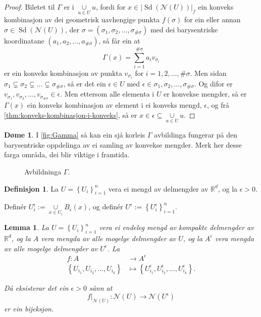 \documentclass[a4paper, 12pt, norsk]{article}
\theoremstyle{plain}
\newtheorem{lemma}[theorem]{Lemma}
\theoremstyle{definition}
\newtheorem{definition}[theorem]{Definisjon}
\newtheorem{example}[theorem]{Døme}
\newcommand{\Rb}{\mathbb{R}}
\newcommand{\Nc}{\mathcal{N}}
\newcommand{\union}{ \mathop{\cup}\limits }
\newcommand{\gr}[1]{ \lvert #1 \rvert } %
\newcommand{\set}[1]{ \left\{ #1 \right\} } %
\newcommand{\tuple}[1]{ \left( #1 \right) } %
\DeclareMathOperator{\Sd}{Sd} %
\begin{document}
\begin{proof}
	Biletet til \( \Gamma \) er i \( \union_{u\in U} u \), fordi for \( x \in \gr{\Sd(\Nc(U))}_f \) ein konveks kombinasjon av dei geometrisk uavhengige punkta \( f(\sigma) \) for ein eller annan \( \sigma \in \Sd(\Nc(U)) \), der \( \sigma = \tuple{\sigma_1, \sigma_2, \dots, \sigma_{\#\sigma}} \) med dei barysentriske koordinatane \( \tuple{a_1, a_2, \dots, a_{\#\sigma}} \), så får ein at
	\[
		\Gamma(x) = \sum_{i=1}^{\#\sigma} a_i v_{\sigma_i}
	\]
	er ein konveks kombinasjon av punkta \( v_{\sigma_i} \) for \( i = 1,2,\dots,\#\sigma \). Men sidan \( \sigma_1 \subsetneq \sigma_2 \subsetneq \dots \subsetneq \sigma_{\#\sigma} \), så er det ein \( \epsilon \in U \) med \( \epsilon \in \sigma_1, \sigma_2, \dots, \sigma_{\#\sigma} \). Og difor er \( v_{\sigma_1}, v_{\sigma_2}, \dots, v_{\sigma_{\#\sigma}} \in \epsilon \). Men ettersom alle elementa i \( U \) er konvekse mengder, så er \( \Gamma(x) \) ein konveks kombinasjon av element i ei konveks mengd, \( \epsilon \), og frå \autoref{thm:konveks-kombinasjon-i-konveks}, så er \( x \in \epsilon \subseteq \union_{u\in U} u \).
\end{proof}

\begin{example}
	I \autoref{fig:Gamma} så kan ein sjå korleis \( \Gamma \) avbildinga fungerar på den barysentriske oppdelinga av ei samling av konvekse mengder. Merk her desse farga områda, dei blir viktige i framtida.
	\begin{figure}[htbp]
		\begin{center}
			
		\end{center}
		\caption{Avbildninga \( \Gamma \).}
		\label{fig:Gamma}
	\end{figure}
\end{example}

\begin{definition}
	La \(  U=\set{U_i}_{i=1}^n \) vera ei mengd av delmengder av \( \Rb^d \), og la \( \epsilon > 0 \).
	
	Definér \( U_i^\epsilon := \union_{x \in U_i} B_\epsilon(x) \), og definér \( U^\epsilon := \set{U_i^\epsilon}_{i=1}^n \).
\end{definition}

\begin{lemma} \label{thm:epsilondekke}
	La \( U = \set{U_i}_{i=1}^n \) vera ei endeleg mengd av kompakte delmengder av \( \Rb^d \), og la \( A \) vera mengda av alle mogelge delmengder av \( U \), og la \( A^\epsilon \) vera mengda av alle mogelge delmengder av \( U^\epsilon \). La
	\begin{align*}
		f: A &\to A^\epsilon \\
		\set{U_{i_1}, U_{i_2}, \dots, U_{i_k}} &\mapsto \set{U_{i_1}^\epsilon, U_{i_2}^\epsilon, \dots, U_{i_k}^\epsilon}.
	\end{align*}
	
	Då eksisterar det ein \( \epsilon > 0 \) sånn at
	\[
		f|_{\Nc(U)}: \Nc(U) \to \Nc(U^\epsilon)
	\]
	er ein bijeksjon.
\end{lemma}
\end{document}
